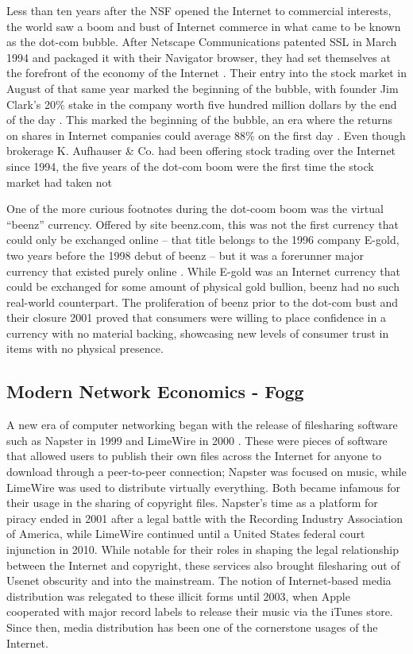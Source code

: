 \documentclass[journal]{IEEEtran}
\begin{document}
Less than ten years after the NSF opened the Internet to commercial interests, the world saw a boom and bust of Internet commerce in what came to be known as the dot-com bubble. After Netscape Communications patented SSL in March 1994 and packaged it with their Navigator browser, they had set themselves at the forefront of the economy of the Internet \cite{netscapessl}. Their entry into the stock market in August of that same year marked the beginning of the bubble, with founder Jim Clark's 20\% stake in the company worth five hundred million dollars by the end of the day \cite{netscapeipo} \cite{netscapebubble}. This marked the beginning of the bubble, an era where the returns on shares in Internet companies could average 88\% on the first day \cite{ljungvist02}. Even though brokerage K. Aufhauser \& Co. had been offering stock trading over the Internet since 1994, the five years of the dot-com boom were the first time the stock market had taken not

One of the more curious footnotes during the dot-coom boom was the virtual \enquote{beenz} currency. Offered by site beenz.com, this was not the first currency that could only be exchanged online -- that title belongs to the 1996 company E-gold, two years before the 1998 debut of beenz -- but it was a forerunner major currency that existed purely online \cite{virtualcurrencyhistory}. While E-gold was an Internet currency that could be exchanged for some amount of physical gold bullion, beenz had no such real-world counterpart. The proliferation of beenz prior to the dot-com bust and their closure 2001 proved that consumers were willing to place confidence in a currency with no material backing, showcasing new levels of consumer trust in items with no physical presence.

\subsection{Modern Network Economics - Fogg}
A new era of computer networking began with the release of filesharing software such as Napster in 1999 and LimeWire in 2000 \cite{napsterlimewiredates}. These were pieces of software that allowed users to publish their own files across the Internet for anyone to download through a peer-to-peer connection; Napster was focused on music, while LimeWire was used to distribute virtually everything. Both became infamous for their usage in the sharing of copyright files. Napster's time as a platform for piracy ended in 2001 after a legal battle with the Recording Industry Association of America, while LimeWire continued until a United States federal court injunction in 2010. While notable for their roles in shaping the legal relationship between the Internet and copyright, these services also brought filesharing out of Usenet obscurity and into the mainstream. The notion of Internet-based media distribution was relegated to these illicit forms until 2003, when Apple cooperated with major record labels to release their music via the iTunes store. Since then, media distribution has been one of the cornerstone usages of the Internet.
\end{document}

